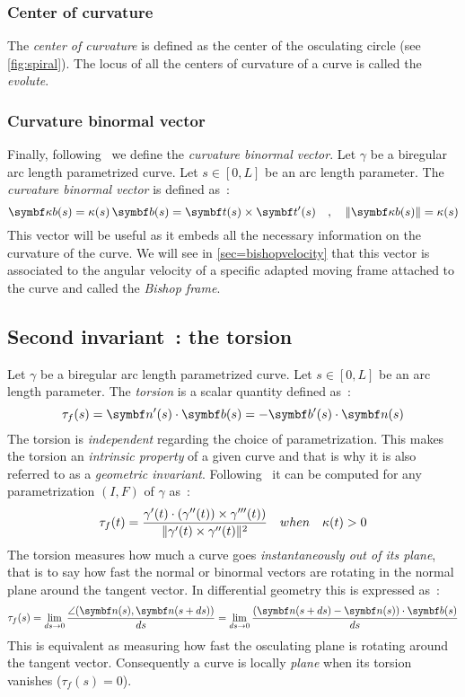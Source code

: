 \subsubsection{Center of curvature}
The \emph{center of curvature} is defined as the center of the osculating circle (see \cref{fig:spiral}). The locus of all the centers of curvature of a curve is called the \emph{evolute}.

\subsubsection{Curvature binormal vector}
\label{sec=kb}
Finally, following~\cite{Bergou2008} we define the \emph{curvature binormal vector}. Let $\gamma$ be a biregular arc length parametrized curve. Let $s\in [0,L]$ be an arc length parameter. The \emph{curvature binormal vector} is defined as~:
\begin{equation}
	\vect{\kappa b}(s) = \kappa(s)\,\vect{b}(s) = \vect{t}(s) \times \vect{t}'(s)
	\quad,\quad
	\norm{\vect{\kappa b}(s)}= \kappa(s)
\label{eq:kb}
\end{equation}
This vector will be useful as it embeds all the necessary information on the curvature of the curve. We will see in \cref{sec=bishopvelocity} that this vector is associated to the angular velocity of a specific adapted moving frame attached to the curve and called the \emph{Bishop frame}.

\subsection{Second invariant~: the torsion}\label{sec=torsion}
Let $\gamma$ be a biregular arc length parametrized curve. Let $s \in [0,L]$ be an arc length parameter. The \emph{torsion} is a scalar quantity defined as~:
\begin{equation}
	\tau_f(s) = \vect{n}'(s) \cdot \vect{b}(s) = - \vect{b}'(s) \cdot \vect{n}(s)
\end{equation}
The torsion is \emph{independent} regarding the choice of parametrization. This makes the torsion an \emph{intrinsic property} of a given curve and that is why it is also referred to as a \emph{geometric invariant}. Following~\cite[p.204]{Gray2006} it can be computed for any parametrization $(I,F)$ of $\gamma$ as~:
\begin{equation}
	\tau_f(t) = \frac{\gamma'(t) \cdot (\gamma''(t)) \times \gamma'''(t))}{\lVert\gamma'(t) \times \gamma''(t)\rVert^2}
	\quad when \quad
	\kappa(t) > 0
\end{equation}
The torsion measures how much a curve goes \emph{instantaneously out of its plane}, that is to say how fast the normal or binormal vectors are rotating in the normal plane around the tangent vector. In differential geometry this is expressed as~:
\begin{equation}
	\tau_f(s) 
	= \lim_{ds \to 0}\frac{\angle(\vect{n}(s),\vect{n}(s+ds))}{ds}
	= \lim_{ds \to 0}\frac{(\vect{n}(s+ds) - \vect{n}(s)) \cdot \vect{b}(s)}{ds}
\end{equation}
This is equivalent as measuring how fast the osculating plane is rotating around the tangent vector. Consequently a curve is locally \emph{plane} when its torsion vanishes ($\tau_f(s) = 0$).

